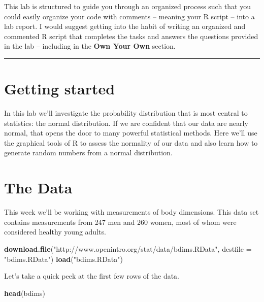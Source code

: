 \documentclass[]{book}
\newenvironment{Shaded}{\begin{snugshade}}{\end{snugshade}}
\newcommand{\KeywordTok}[1]{\textcolor[rgb]{0.13,0.29,0.53}{\textbf{#1}}}
\newcommand{\DataTypeTok}[1]{\textcolor[rgb]{0.13,0.29,0.53}{#1}}
\newcommand{\StringTok}[1]{\textcolor[rgb]{0.31,0.60,0.02}{#1}}
\newcommand{\NormalTok}[1]{#1}
\theoremstyle{definition}
\theoremstyle{definition}
\theoremstyle{definition}
\theoremstyle{remark}
\begin{document}
This lab is structured to guide you through an organized process such
that you could easily organize your code with comments -- meaning your R
script -- into a lab report. I would suggest getting into the habit of
writing an organized and commented R script that completes the tasks and
answers the questions provided in the lab -- including in the
\textbf{Own Your Own} section.

\begin{center}\rule{0.5\linewidth}{\linethickness}\end{center}

\section{Getting started}\label{getting-started-1}

In this lab we'll investigate the probability distribution that is most
central to statistics: the normal distribution. If we are confident that
our data are nearly normal, that opens the door to many powerful
statistical methods. Here we'll use the graphical tools of R to assess
the normality of our data and also learn how to generate random numbers
from a normal distribution.

\section{The Data}\label{the-data}

This week we'll be working with measurements of body dimensions. This
data set contains measurements from 247 men and 260 women, most of whom
were considered healthy young adults.

\begin{Shaded}
\begin{Highlighting}[]
\KeywordTok{download.file}\NormalTok{(}\StringTok{"http://www.openintro.org/stat/data/bdims.RData"}\NormalTok{, }\DataTypeTok{destfile =} \StringTok{"bdims.RData"}\NormalTok{)}
\KeywordTok{load}\NormalTok{(}\StringTok{"bdims.RData"}\NormalTok{)}
\end{Highlighting}
\end{Shaded}

Let's take a quick peek at the first few rows of the data.

\begin{Shaded}
\begin{Highlighting}[]
\KeywordTok{head}\NormalTok{(bdims)}
\end{Highlighting}
\end{Shaded}
\end{document}
